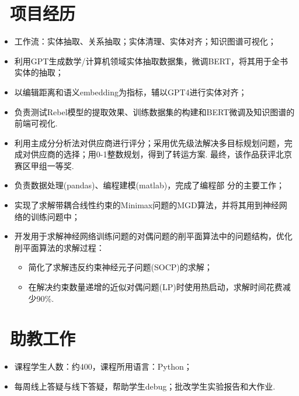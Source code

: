 \documentclass{resume}
\begin{document}
\section{\faUsers\ 项目经历}
\begin{itemize}
	\item 工作流：实体抽取、关系抽取；实体清理、实体对齐；知识图谱可视化；
	\item 利用GPT生成数学/计算机领域实体抽取数据集，微调BERT，将其用于全书实体的抽取；
	\item 以编辑距离和语义embedding为指标，辅以GPT4进行实体对齐；
	\item 负责测试Rebel模型的提取效果、训练数据集的构建和BERT微调及知识图谱的前端可视化.
\end{itemize}

\begin{itemize}
	\item 利用主成分分析法对供应商进行评分；采用优先级法解决多目标规划问题，完成对供应商的选择；用0-1整数规划，得到了转运方案. 最终，该作品获评北京赛区甲组一等奖.
	\item 负责数据处理(pandas)、编程建模(matlab)，完成了编程部
	      分的主要工作；
\end{itemize}

\begin{itemize}
	\item 实现了求解带耦合线性约束的Minimax问题的MGD算法，并将其用到神经网络的训练问题中；
	\item 开发用于求解神经网络训练问题的对偶问题的削平面算法中的问题结构，优化削平面算法的求解过程：
	      \begin{itemize}[label=$\ast$]
		      \item 简化了求解违反约束神经元子问题(SOCP)的求解；
		      \item 在解决约束数量递增的近似对偶问题(LP)时使用热启动，求解时间花费减少90\%.
	      \end{itemize}
\end{itemize}

\section{\faUniversity\ 助教工作}
\begin{itemize}
	\item 课程学生人数：约400，课程所用语言：Python；
	\item 每周线上答疑与线下答疑，帮助学生debug；批改学生实验报告和大作业.
\end{itemize}
\end{document}
